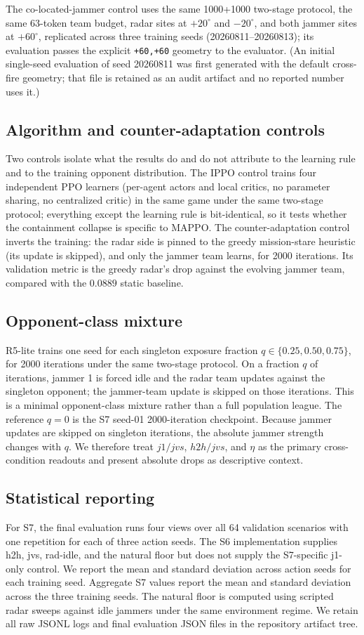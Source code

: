 The co-located-jammer control uses the same 1000+1000 two-stage protocol, the same 63-token team budget, radar sites at $+20^\circ$ and $-20^\circ$, and both jammer sites at $+60^\circ$, replicated across three training seeds (20260811--20260813); its evaluation passes the explicit \texttt{+60,+60} geometry to the evaluator. (An initial single-seed evaluation of seed 20260811 was first generated with the default cross-fire geometry; that file is retained as an audit artifact and no reported number uses it.)

\subsection{Algorithm and counter-adaptation controls}
Two controls isolate what the results do and do not attribute to the learning rule and to the training opponent distribution. The IPPO control trains four independent PPO learners (per-agent actors and local critics, no parameter sharing, no centralized critic) in the same game under the same two-stage protocol; everything except the learning rule is bit-identical, so it tests whether the containment collapse is specific to MAPPO. The counter-adaptation control inverts the training: the radar side is pinned to the greedy mission-stare heuristic (its update is skipped), and only the jammer team learns, for 2000 iterations. Its validation metric is the greedy radar's drop against the evolving jammer team, compared with the $0.0889$ static baseline.

\subsection{Opponent-class mixture}
R5-lite trains one seed for each singleton exposure fraction $q\in\{0.25,0.50,0.75\}$, for 2000 iterations under the same two-stage protocol. On a fraction $q$ of iterations, jammer 1 is forced idle and the radar team updates against the singleton opponent; the jammer-team update is skipped on those iterations. This is a minimal opponent-class mixture rather than a full population league. The reference $q=0$ is the S7 seed-01 2000-iteration checkpoint. Because jammer updates are skipped on singleton iterations, the absolute jammer strength changes with $q$. We therefore treat $j1/jvs$, $h2h/jvs$, and $\eta$ as the primary cross-condition readouts and present absolute drops as descriptive context.

\subsection{Statistical reporting}
For S7, the final evaluation runs four views over all 64 validation scenarios with one repetition for each of three action seeds. The S6 implementation supplies h2h, jvs, rad-idle, and the natural floor but does not supply the S7-specific j1-only control. We report the mean and standard deviation across action seeds for each training seed. Aggregate S7 values report the mean and standard deviation across the three training seeds. The natural floor is computed using scripted radar sweeps against idle jammers under the same environment regime. We retain all raw JSONL logs and final evaluation JSON files in the repository artifact tree.

